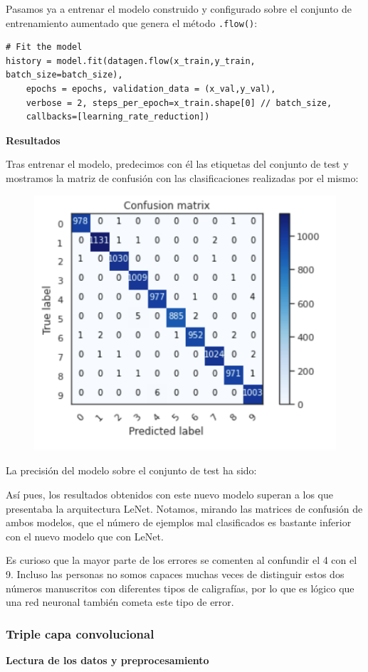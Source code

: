 \documentclass[a4paper,11pt]{article}
\begin{document}
Pasamos ya a entrenar el modelo construido y configurado sobre el conjunto de entrenamiento aumentado que genera el método \texttt{.flow()}:
\begin{verbatim}
# Fit the model
history = model.fit(datagen.flow(x_train,y_train, batch_size=batch_size),
	epochs = epochs, validation_data = (x_val,y_val),
	verbose = 2, steps_per_epoch=x_train.shape[0] // batch_size, 
	callbacks=[learning_rate_reduction])
\end{verbatim}
\textbf{Resultados}

Tras entrenar el modelo, predecimos con él las etiquetas del conjunto de test y mostramos la matriz de confusión con las clasificaciones realizadas por el mismo:
\begin{figure}[H]
	\centering
	\includegraphics[width=0.7\linewidth]{img/cnn2}
	\caption{}
	\label{fig:cnn2}
\end{figure}


La precisión del modelo sobre el conjunto de test ha sido:

Así pues, los resultados obtenidos con este nuevo modelo superan a los que presentaba la arquitectura LeNet. Notamos, mirando las matrices de confusión de ambos modelos, que el número de ejemplos mal clasificados es bastante inferior con el nuevo modelo que con LeNet. 

Es curioso que la mayor parte de los errores se comenten al confundir el 4 con el 9. Incluso las personas no somos capaces muchas veces de distinguir estos dos números manuscritos con diferentes tipos de caligrafías, por lo que es lógico que una red neuronal también cometa este tipo de error. 

\subsubsection{Triple capa convolucional}
\textbf{Lectura de los datos y preprocesamiento}
\end{document}
